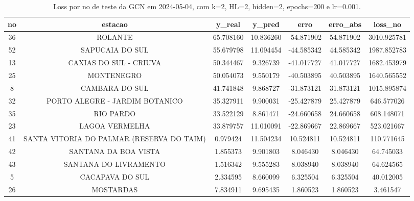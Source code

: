 \begin{table}[h]
\centering
\caption{Loss por no de teste da GCN em 2024-05-04, com k=2, HL=2, hidden=2, epochs=200 e lr=0.001.}
\label{tab:gcn_loss_k2_hl2_h2_e200_d20240504}
\begin{tabular}{ccccccc}
\toprule
no & estacao & y\_real & y\_pred & erro & erro\_abs & loss\_no \\
\midrule
36 & ROLANTE & 65.708160 & 10.836260 & -54.871902 & 54.871902 & 3010.925781 \\
52 & SAPUCAIA DO SUL & 55.679798 & 11.094454 & -44.585342 & 44.585342 & 1987.852783 \\
13 & CAXIAS DO SUL - CRIUVA & 50.344467 & 9.326739 & -41.017727 & 41.017727 & 1682.453979 \\
25 & MONTENEGRO & 50.054073 & 9.550179 & -40.503895 & 40.503895 & 1640.565552 \\
8 & CAMBARA DO SUL & 41.741848 & 9.868727 & -31.873121 & 31.873121 & 1015.895874 \\
32 & PORTO ALEGRE - JARDIM BOTANICO & 35.327911 & 9.900031 & -25.427879 & 25.427879 & 646.577026 \\
35 & RIO PARDO & 33.522129 & 8.861471 & -24.660658 & 24.660658 & 608.148071 \\
23 & LAGOA VERMELHA & 33.879757 & 11.010091 & -22.869667 & 22.869667 & 523.021667 \\
41 & SANTA VITORIA DO PALMAR (RESERVA DO TAIM) & 0.979424 & 11.504234 & 10.524811 & 10.524811 & 110.771645 \\
42 & SANTANA DA BOA VISTA & 1.855373 & 9.901803 & 8.046430 & 8.046430 & 64.745033 \\
43 & SANTANA DO LIVRAMENTO & 1.516342 & 9.555283 & 8.038940 & 8.038940 & 64.624565 \\
5 & CACAPAVA DO SUL & 2.334595 & 8.660099 & 6.325504 & 6.325504 & 40.012005 \\
26 & MOSTARDAS & 7.834911 & 9.695435 & 1.860523 & 1.860523 & 3.461547 \\
\bottomrule
\end{tabular}
\end{table}
